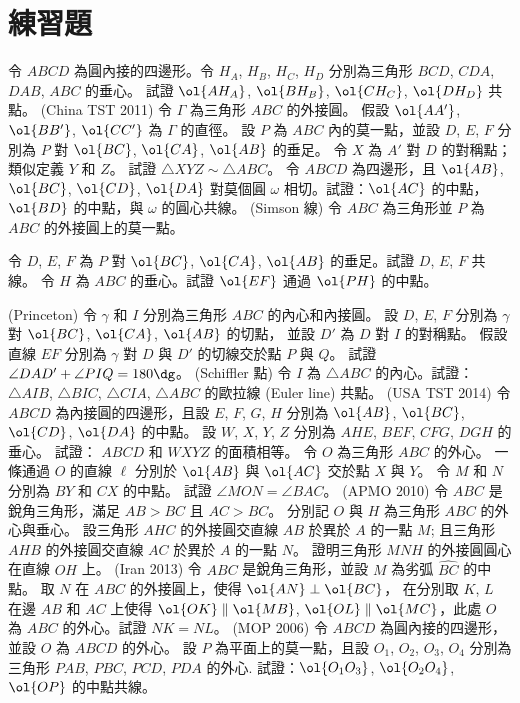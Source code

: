 \documentclass[11pt]{scrartcl}
\theoremstyle{definition}
\begin{document}
\section{練習題}
\begin{enumerate}
  \ii 令 $ABCD$ 為圓內接的四邊形。令 $H_A$, $H_B$, $H_C$, $H_D$
  分別為三角形 $BCD$, $CDA$, $DAB$, $ABC$ 的垂心。
  試證 $\ol{AH_A}$, $\ol{BH_B}$, $\ol{CH_C}$, $\ol{DH_D}$ 共點。
  \ii (China TST 2011) 令 $\Gamma$ 為三角形 $ABC$ 的外接圓。
  假設 $\ol{AA'}$, $\ol{BB'}$, $\ol{CC'}$ 為 $\Gamma$ 的直徑。
  設 $P$ 為 $ABC$ 內的莫一點，並設 $D$, $E$, $F$ 分別為 $P$ 對
  $\ol{BC}$, $\ol{CA}$, $\ol{AB}$ 的垂足。
  令 $X$ 為 $A'$ 對 $D$ 的對稱點；類似定義 $Y$ 和 $Z$。
  試證 $\triangle XYZ \sim \triangle ABC$。
  \ii 令 $ABCD$ 為四邊形，且 $\ol{AB}$, $\ol{BC}$, $\ol{CD}$, $\ol{DA}$ 對莫個圓 $\omega$ 相切。試證：$\ol{AC}$ 的中點，$\ol{BD}$ 的中點，與 $\omega$ 的圓心共線。
  \ii (Simson 線) 令 $ABC$ 為三角形並 $P$ 為 $ABC$ 的外接圓上的莫一點。
  \begin{enumerate}[(a)]
    \ii 令 $D$, $E$, $F$ 為 $P$ 對 $\ol{BC}$, $\ol{CA}$, $\ol{AB}$ 的垂足。試證 $D$, $E$, $F$ 共線。
    \ii 令 $H$ 為 $ABC$ 的垂心。試證 $\ol{EF}$ 通過 $\ol{PH}$ 的中點。
  \end{enumerate}
  \ii (Princeton) 令 $\gamma$ 和 $I$ 分別為三角形 $ABC$ 的內心和內接圓。
  設 $D$, $E$, $F$ 分別為 $\gamma$ 對 $\ol{BC}$, $\ol{CA}$, $\ol{AB}$ 的切點，
  並設 $D'$ 為 $D$ 對 $I$ 的對稱點。
  假設直線 $EF$ 分別為 $\gamma$ 對 $D$ 與 $D'$ 的切線交於點 $P$ 與 $Q$。
  試證 $\angle DAD' + \angle PIQ = 180\dg$。
  \ii (Schiffler 點) 令 $I$ 為 $\triangle ABC$ 的內心。試證： $\triangle AIB$, $\triangle BIC$, $\triangle CIA$, $\triangle ABC$ 的歐拉線 (Euler line) 共點。
  \ii (USA TST 2014) 令 $ABCD$ 為內接圓的四邊形，且設
  $E$, $F$, $G$, $H$ 分別為 $\ol{AB}$, $\ol{BC}$, $\ol{CD}$, $\ol{DA}$ 的中點。
  設 $W$, $X$, $Y$, $Z$ 分別為 $AHE$, $BEF$, $CFG$, $DGH$ 的垂心。
  試證： $ABCD$ 和 $WXYZ$ 的面積相等。
  \ii 令 $O$ 為三角形 $ABC$ 的外心。
  一條通過 $O$ 的直線 $\ell$ 分別於 $\ol{AB}$ 與 $\ol{AC}$ 交於點 $X$ 與 $Y$。
  令 $M$ 和 $N$ 分別為 $BY$ 和 $CX$ 的中點。
  試證 $\angle MON = \angle BAC$。
  \ii (APMO 2010) 令 $ABC$ 是銳角三角形，滿足 $AB > BC$ 且 $AC > BC$。
  分別記 $O$ 與 $H$ 為三角形 $ABC$ 的外心與垂心。
  設三角形 $AHC$ 的外接圓交直線 $AB$ 於異於 $A$ 的一點 $M$;
  且三角形 $AHB$ 的外接圓交直線 $AC$ 於異於 $A$ 的一點 $N$。
  證明三角形 $MNH$ 的外接圓圓心在直線 $OH$ 上。
  \ii (Iran 2013) 令 $ABC$ 是銳角三角形，並設 $M$ 為劣弧 $\widehat{BC}$ 的中點。
  取 $N$ 在 $ABC$ 的外接圓上，使得 $\ol{AN} \perp \ol{BC}$，
  在分別取 $K$, $L$ 在邊 $AB$ 和 $AC$ 上使得 $\ol{OK} \parallel \ol{MB}$,
  $\ol{OL} \parallel \ol{MC}$，此處 $O$ 為 $ABC$ 的外心。試證 $NK = NL$。
  \ii (MOP 2006) 令 $ABCD$ 為圓內接的四邊形，並設 $O$ 為 $ABCD$ 的外心。
  設 $P$ 為平面上的莫一點，且設 $O_1$, $O_2$, $O_3$, $O_4$
  分別為三角形 $PAB$, $PBC$, $PCD$, $PDA$ 的外心.
  試證：$\ol{O_1 O_3}$, $\ol{O_2O_4}$, $\ol{OP}$ 的中點共線。
\end{enumerate}
\end{document}

